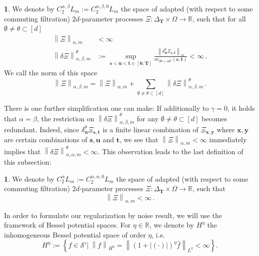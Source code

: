 \documentclass[11pt,oneside,english,reqno]{amsart}
\numberwithin{equation}{section}
\numberwithin{figure}{section}
\theoremstyle{plain}
\theoremstyle{definition}
\newtheorem{defn}[thm]{\protect\definitionname}
\theoremstyle{remark}
\theoremstyle{plain}
\theoremstyle{plain}
\theoremstyle{plain}
\theoremstyle{plain}
\theoremstyle{plain}
\providecommand{\definitionname}{Definition}
\newcommand{\RR}{\mathbb{R}}
\newcommand{\bT}{\mathbf{T}}
\newcommand{\bx}{\mathbf{x}}
\newcommand{\by}{\mathbf{y}}
\newcommand{\boo}{\mathbf{0}}
\newcommand{\bu}{\mathbf{u}}
\newcommand{\bs}{\mathbf{s}}
\newcommand{\bt}{\mathbf{t}}
\newcommand{\norm}[1]{\left\lVert #1\right\rVert}
\begin{document}
\begin{defn}
    We denote by $C_2^{\alpha,\beta} L_m := C_2^{\alpha,\beta,0} L_m$ the space of adapted (with respect to some commuting filtration) $2d$-parameter processes $\Xi:\Delta_\bT\times\Omega\to\RR$, such that for all $\emptyset\neq\theta\subset[d]$
%
    \begin{align*}
        \norm{\Xi}_{\alpha,m} &<\infty\\
        \norm{\delta\Xi}_{\alpha,\beta,m}^\theta &:= \sup_{\bs<\bu<\bt\in[\boo,\bT]}\frac{\norm{\delta^\theta_\bu\Xi_{\bs,\bt}}_m}{m_{\beta\theta+\alpha\theta^c}(\bs,\bt)}<\infty\,.
    \end{align*}
%
    We call the norm of this space
    \begin{equation*}
        \norm{\Xi}_{\alpha,\beta,m} = \norm{\Xi}_{\alpha,m} + \sum_{\emptyset\neq\theta\subset[d]}\norm{\delta\Xi}_{\alpha,\beta,m}^\theta\,.
    \end{equation*}
\end{defn}

\noindent There is one further simplification one can make: If additionally to $\gamma=0$, it holds that $\alpha = \beta$, the restriction on $\norm{\delta\Xi}_{\alpha,\beta,m}^\theta$ for any $\emptyset\neq \theta\subset[d]$ becomes redundant. Indeed, since $\delta_\bu^\theta \Xi_{\bs,\bt}$ is a finite linear combination of $\Xi_{\bx,\by}$ where $\bx,\by$ are certain combinations of $\bs,\bu$ and $\bt$, we see that $\norm{\Xi}_{\alpha,m}<\infty$ immediately implies that $\norm{\delta\Xi}^\theta_{\alpha,\alpha,m}<\infty$. This observation leads to the last definition of this subsection:

\begin{defn}
    We denote by $C_2^{\alpha} L_m := C_2^{\alpha,\alpha,0} L_m$ the space of adapted (with respect to some commuting filtration) $2d$-parameter processes $\Xi:\Delta_\bT\times\Omega\to\RR$, such that
%
    \begin{equation*}
        \norm{\Xi}_{\alpha,m}<\infty\,.
    \end{equation*}
\end{defn}

\noindent In order to formulate our regularization by noise result, we will use the framework of Bessel potential spaces. For $\eta\in \RR$, we denote by $H^\eta$ the inhomogeneous Bessel potential space of order $\eta$, i.e.
\begin{equation}\label{bessel_potential}
H^\eta:=\left\{f\in \mathcal{S}'|\ \norm{f}_{H^\eta}=\norm{(1+|(\cdot)|)^\eta \hat{f}}_{L^2}<\infty \right\}.
\end{equation}
\end{document}
